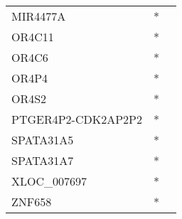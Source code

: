 \begin{tabular}{lcc}
MIR4477A           &  * &         \\
OR4C11             &  * &         \\
OR4C6              &  * &         \\
OR4P4              &  * &         \\
OR4S2              &  * &         \\
PTGER4P2-CDK2AP2P2 &  * &         \\
SPATA31A5          &  * &         \\
SPATA31A7          &  * &         \\
XLOC\_007697        &  * &         \\
ZNF658             &  * &         \\
\bottomrule
\end{tabular}
